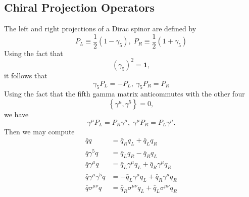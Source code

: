 \documentclass{book}[12pt]
\begin{document}
\subsection{Chiral Projection Operators}
The left and right projections of a Dirac spinor are defined by
\begin{equation}
P_L\equiv \frac{1}{2}\left(1-\gamma_5\right),\;P_R\equiv \frac{1}{2}\left(1+\gamma_5\right)
\end{equation}
Using the fact that 
\begin{equation}
\left(\gamma_5\right)^2=\mathbf{1},
\end{equation}
it follows that
\begin{equation}
\gamma_5 P_L = -P_L,\;\gamma_5P_R=P_R
\end{equation}
Using the fact that the fifth gamma matrix anticommutes with the other four
\begin{equation}
\left\{\gamma^{\mu},\gamma^5\right\}=0,
\end{equation}
we have
\begin{equation}
\gamma^{\mu}P_L=P_R\gamma^{\mu},\;\gamma^{\mu}P_R=P_L\gamma^{\mu}.
\end{equation}
Then we may compute
\begin{equation}
\begin{split}
\bar{q}q&=\bar{q}_Rq_L+\bar{q}_Lq_R\\
\bar{q}\gamma^5q&=\bar{q}_Lq_R-\bar{q}_Rq_L\\
\bar{q}\gamma^{\mu}q&=\bar{q}_L\gamma^{\mu}q_L+\bar{q}_R\gamma^{\mu}q_R\\
\bar{q}\gamma^{\mu}\gamma^5 q&=-\bar{q}_L\gamma^{\mu}q_L +\bar{q}_R\gamma^{\mu}q_R\\
\bar{q}\sigma^{\mu\nu}q&=\bar{q}_R\sigma^{\mu\nu}q_L+\bar{q}_L\sigma^{\mu\nu}q_R
\end{split}
\end{equation}
\end{document}
